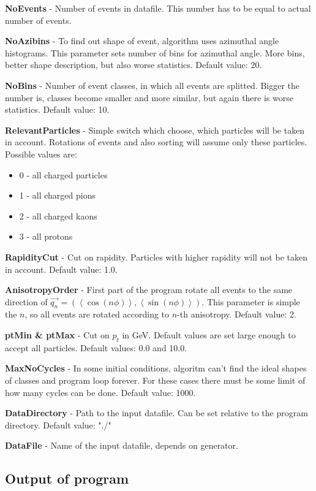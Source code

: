 \documentclass[a4paper]{article}
\begin{document}
\textbf{NoEvents} - Number of events in datafile. This number has to be equal to actual number of events.

\textbf{NoAzibins} - To find out shape of event, algorithm uses azimuthal angle histograms. This parameter sets number of bins for azimuthal angle. More bins, better shape description, but also worse statistics. Default value: 20.

\textbf{NoBins} - Number of event classes, in which all events are splitted. Bigger the number is, classes become smaller and more similar, but again there is worse statistics. Default value: 10.

\textbf{RelevantParticles} - Simple switch which choose, which particles will be taken in account. Rotations of events and also sorting will assume only these particles. Possible values are:
\begin{itemize}
\item 0 - all charged particles
\item 1 - all charged pions
\item 2 - all charged kaons
\item 3 - all protons
\end{itemize}

\textbf{RapidityCut} - Cut on rapidity. Particles with higher rapidity will not be taken in account. Default value: 1.0.

\textbf{AnisotropyOrder} - First part of the program rotate all events to the same direction of ${\vec{q_n}=\left(\left\langle \cos(n\phi)\right\rangle ,\left\langle \sin(n\phi)\right\rangle \right) }$. This parameter is simple the $n$, so all events are rotated according to $n$-th anisotropy. Default value: 2.

\textbf{ptMin \& ptMax} - Cut on $p_t$ in GeV. Default values are set large enough to accept all particles. Default values: 0.0 and 10.0.

\textbf{MaxNoCycles} - In some initial conditions, algoritm can't find the ideal shapes of classes and program loop forever. For these cases there must be some limit of how many cycles can be done. Default value: 1000.

\textbf{DataDirectory} - Path to the input datafile. Can be set relative to the program directory. Default value: "./"

\textbf{DataFile} - Name of the input datafile, depends on generator.

\subsection*{Output of program}
\end{document}
